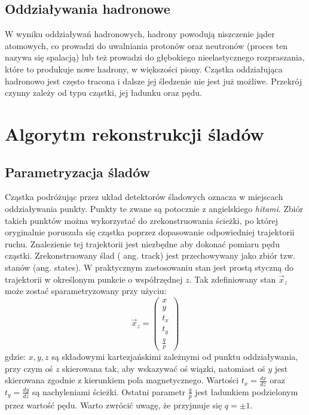 \subsection{Oddziaływania hadronowe}
W wyniku oddziaływań hadronowych, hadrony powodują niszczenie jąder atomowych, co prowadzi do uwalniania protonów oraz neutronów (proces ten nazywa się spalacją) lub też prowadzi do głębokiego nieelastycznego rozpraszania, które to produkuje nowe hadrony, w większości piony. 
Cząstka oddziałująca hadronowo jest często tracona i dalsze jej śledzenie nie jest już możliwe. Przekrój czynny zależy od typu cząstki, jej ładunku oraz pędu. 

\section{Algorytm rekonstrukcji śladów}
\subsection{Parametryzacja śladów}
Cząstka podróżując przez układ detektorów śladowych oznacza w miejscach oddziaływania punkty. Punkty te zwane są potocznie z angielskiego \textit{hitami}. Zbiór takich punktów można wykorzystać do zrekonstruowania ścieżki, po której oryginalnie poruszała się cząstka poprzez dopasowanie odpowiedniej trajektorii ruchu.  Znalezienie tej trajektorii jest niezbędne aby dokonać pomiaru pędu cząstki. Zrekonstruowany ślad ( ang. track) jest przechowywany jako zbiór tzw. stanów (ang. states). W praktycznym zastosowaniu stan jest prostą styczną do trajektorii w określonym punkcie o współrzędnej $z$. Tak zdefiniowany stan $\vec{x}_z$ może zostać sparametryzowany przy użyciu: 
\begin{equation}
\vec{x}_z=\begin{pmatrix}
x\\ y \\ t_x \\ t_y \\ \frac{q}{p}
\end{pmatrix}
\end{equation}
gdzie: $x,y,z$ są składowymi kartezjańskimi zależnymi od punktu oddziaływania, przy czym oś $z$ skierowana tak, aby wskazywać oś wiązki,  natomiast oś $y$ jest skierowana zgodnie z kierunkiem pola magnetycznego. Wartości $t_x=\frac{dx}{dz}$ oraz $t_y=\frac{dy}{dz}$ są nachyleniami ścieżki. Ostatni parametr $\frac{q}{p}$ jest ładunkiem podzielonym przez wartość pędu. Warto zwrócić uwagę, że przyjmuje się $q= \pm 1$.

